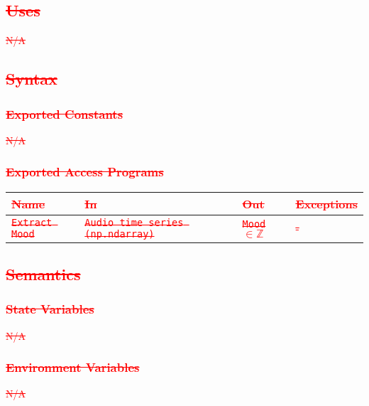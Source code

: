 \documentclass[12pt, titlepage]{article}
\begin{document}
\subsection{\textcolor{red}{\sout{Uses}}}
\textcolor{red}{\sout{N/A}}

\subsection{\textcolor{red}{\sout{Syntax}}}

\subsubsection{\textcolor{red}{\sout{Exported Constants}}}
\textcolor{red}{\sout{N/A}}

\subsubsection{\textcolor{red}{\sout{Exported Access Programs}}}

\begin{center}
\begin{tabular}{p{2cm} p{4cm} p{4cm} p{2cm}}
\hline
\textcolor{red}{\sout{\textbf{Name}}} & \textcolor{red}{\sout{\textbf{In}}} & \textcolor{red}{\sout{\textbf{Out}}} & \textcolor{red}{\sout{\textbf{Exceptions}}}\\
\hline
\textcolor{red}{\sout{\texttt{Extract Mood}}} & \textcolor{red}{\sout{\texttt{Audio time series (np.ndarray)}}} & \textcolor{red}{\sout{\texttt{Mood} $\in{\mathbb{Z}}$}} & \textcolor{red}{\sout{-}}\\
\hline
\end{tabular}
\end{center}

\subsection{\textcolor{red}{\sout{Semantics}}}

\subsubsection{\textcolor{red}{\sout{State Variables}}}
\textcolor{red}{\sout{N/A}}

\subsubsection{\textcolor{red}{\sout{Environment Variables}}}
\textcolor{red}{\sout{N/A}}
\end{document}
